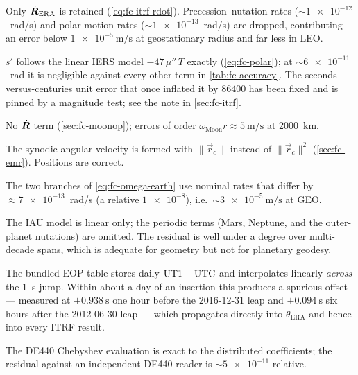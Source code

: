 \begin{description}[leftmargin=0.9cm,style=nextline,font=\normalfont\itshape]
  \item[Velocity of the GCRF$\leftrightarrow$ITRF transform.]
    Only $\dot{\bm{R}}_{\mathrm{ERA}}$ is retained
    (\cref{eq:fc-itrf-rdot}). Precession--nutation rates
    ($\sim\num{1e-12}$~rad/s) and polar-motion rates ($\sim\num{1e-13}$~rad/s)
    are dropped, contributing an error below
    $\SI{1e-5}{\meter\per\second}$ at geostationary radius and far less in
    LEO.
  \item[TIO locator.] $s'$ follows the linear IERS model
    $-47\,\mu''\,T$ exactly (\cref{eq:fc-polar}); at $\sim\num{6e-11}$~rad it
    is negligible against every other term in \cref{tab:fc-accuracy}. The
    seconds-versus-centuries unit error that once inflated it by
    $\num{86400}$ has been fixed and is pinned by a magnitude test; see the
    note in \cref{sec:fc-itrf}.
  \item[MOON\_OP velocity.] No $\dot{\bm{R}}$ term
    (\cref{sec:fc-moonop}); errors of order
    $\omega_{\mathrm{Moon}} r \approx \SI{5}{\meter\per\second}$ at
    \SI{2000}{\kilo\meter}.
  \item[EMR velocity.] The synodic angular velocity is formed with
    $\lVert\vec{r}_c\rVert$ instead of $\lVert\vec{r}_c\rVert^2$
    (\cref{sec:fc-emr}). Positions are correct.
  \item[Earth rotation rate.] The two branches of
    \cref{eq:fc-omega-earth} use nominal rates that differ by
    $\approx\num{7e-13}$~rad/s (a relative $\num{1e-8}$), i.e.\
    $\sim\SI{3e-5}{\meter\per\second}$ at GEO.
  \item[Planet orientation.] The IAU model is linear only; the periodic
    terms (Mars, Neptune, and the outer-planet nutations) are omitted. The
    residual is well under a degree over multi-decade spans, which is
    adequate for geometry but not for planetary geodesy.
  \item[EOP interpolation across leap seconds.] The bundled EOP table stores
    daily $\mathrm{UT1}-\mathrm{UTC}$ and interpolates linearly \emph{across} the
    \SI{1}{\second} jump. Within about a day of an insertion this produces a
    spurious offset --- measured at $+\SI{0.938}{\second}$ one hour before the
    2016-12-31 leap and $+\SI{0.094}{\second}$ six hours after the
    2012-06-30 leap --- which propagates directly into
    $\theta_{\mathrm{ERA}}$ and hence into every ITRF result.
  \item[Ephemeris interpolation.] The DE440 Chebyshev evaluation is exact to
    the distributed coefficients; the residual against an independent
    DE440 reader is $\sim\num{5e-11}$ relative.
\end{description}

